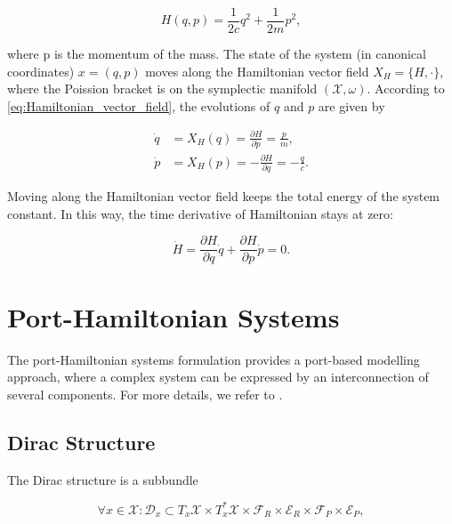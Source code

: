 \documentclass[
	parskip, 			   %
	twoside, 			   %
	DIV=14, 			   %
	BCOR=15.0mm, 		   %
	headsepline, 		   %
	open=right, 		   %
	captions=tableheading, %
	bibliography=totoc,    %
	numbers=noenddot       %
]{scrreprt}
\begin{document}
\begin{equation}
    \label{eq:Hamiltonian_udho}
    H(q,p)=\frac{1}{2c}q^2+\frac{1}{2m}p^2,
\end{equation}

where p is the momentum of the mass. The state of the system (in canonical coordinates) $x=(q,p)$ moves along the Hamiltonian vector field $X_{H}=\{H, \cdot\}$, where the Poission bracket is on the symplectic manifold $(\mathcal{X},\omega)$. According to \ref{eq:Hamiltonian_vector_field}, the evolutions of $q$ and $p$ are given by

\begin{equation}
    \label{eq:ODE_undamped_harmonic_oscillator}
    \begin{aligned}
        \dot{q}&=X_{H}(q)=\frac{\partial H}{\partial p}=\frac{p}{m},\\
        \dot{p}&=X_{H}(p)=-\frac{\partial H}{\partial q}=-\frac{q}{c}.
    \end{aligned}
\end{equation}

Moving along the Hamiltonian vector field keeps the total energy of the system constant. In this way, the time derivative of Hamiltonian stays at zero:

\begin{equation}
    \label{eq:derivative_Hamiltonian}
    \dot{H}=\frac{\partial H}{\partial q}\dot{q}+\frac{\partial H}{\partial p}\dot{p}=0.
\end{equation}


\section{Port-Hamiltonian Systems}
The port-Hamiltonian systems formulation provides a port-based modelling approach, where a complex system can be expressed by an interconnection of several components. For more details, we refer to \cite{van2014port}.

\subsection{Dirac Structure}
The Dirac structure is a subbundle

\begin{equation}
    \label{eq:Dirac_structure}
    \forall x \in \mathcal{X}: \mathcal{D}_x \subset T_{x}\mathcal{X} \times T_{x}^{*}\mathcal{X} \times \mathcal{F}_R \times \mathcal{E}_R \times \mathcal{F}_P \times \mathcal{E}_P,
\end{equation}
\end{document}
